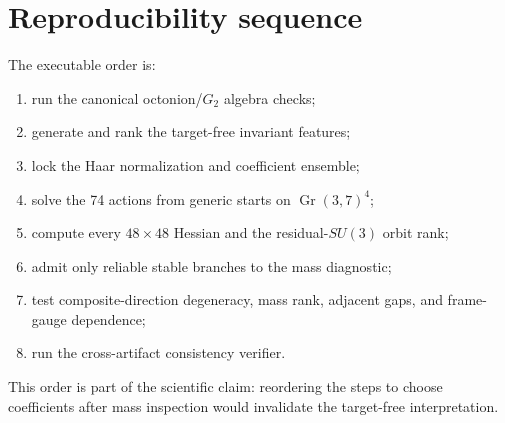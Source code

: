 \documentclass[11pt]{article}
\newcommand{\Gr}{\operatorname{Gr}}
\begin{document}
\section{Reproducibility sequence}

The executable order is:
\begin{enumerate}
  \item run the canonical octonion/$G_2$ algebra checks;
  \item generate and rank the target-free invariant features;
  \item lock the Haar normalization and coefficient ensemble;
  \item solve the 74 actions from generic starts on $\Gr(3,7)^4$;
  \item compute every $48\times48$ Hessian and the residual-$SU(3)$ orbit rank;
  \item admit only reliable stable branches to the mass diagnostic;
  \item test composite-direction degeneracy, mass rank, adjacent gaps, and frame-gauge dependence;
  \item run the cross-artifact consistency verifier.
\end{enumerate}
This order is part of the scientific claim: reordering the steps to choose coefficients after mass inspection would invalidate the target-free interpretation.



\end{document}

